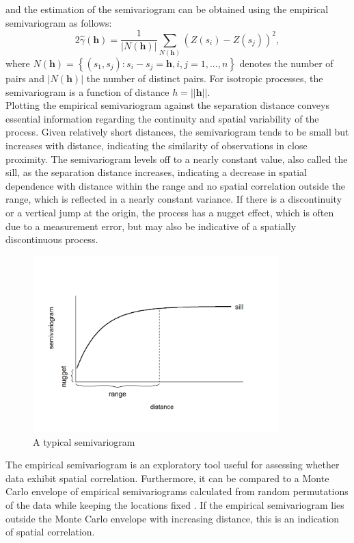and the estimation of the semivariogram can be obtained using the empirical semivariogram as follows:
\begin{equation}
    2\widehat{\gamma}\left(\pmb{h}\right)=\frac{1}{\left|N\left(\pmb{h}\right)\right|}\sum_{N\left(\pmb{h}\right)}\left(Z\left(s_i\right)-Z\left(s_j\right)\right)^2,
\end{equation}
where $N\left(\pmb{h}\right)=\left\lbrace\left(s_1,s_j\right):s_i-s_j=\pmb{h}, i,j=1,...,n\right\rbrace$ denotes the number of pairs and $\left|N\left(\pmb{h}\right)\right|$ the number of distinct pairs. For isotropic processes, the semivariogram is a function of distance $h=\left|\left|\pmb{h}\right|\right|$.   \\
Plotting the empirical semivariogram against the separation distance conveys essential information regarding the continuity and spatial variability of the process. Given relatively short distances, the semivariogram tends to be small but increases with distance, indicating the similarity of observations in close proximity. The semivariogram levels off to a nearly constant value, also called the sill, as the separation distance increases, indicating a decrease in spatial dependence with distance within the range and no spatial correlation outside the range, which is reflected in a nearly constant variance. If there is a discontinuity or a vertical jump at the origin, the process has a nugget effect, which is often due to a measurement error, but may also be indicative of a spatially discontinuous process.
\begin{figure}
    \centering
    \includegraphics[width=0.85\textwidth]{typicalsemivariogram-1.png}
    \caption{A typical semivariogram}
    \label{fig:semivariogram}
\end{figure}
The empirical semivariogram is an exploratory tool useful for assessing whether data exhibit spatial correlation. Furthermore, it can be compared to a Monte Carlo envelope of empirical semivariograms calculated from random permutations of the data while keeping the locations fixed \autocite[][]{diggle2003introduction}. If the empirical semivariogram lies outside the Monte Carlo envelope with increasing distance, this is an indication of spatial correlation.\\
